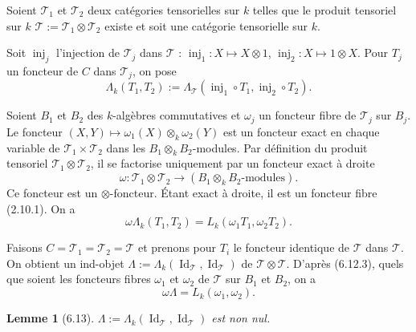 \documentclass[12pt,a4paper]{article}
\theoremstyle{plain}
\newtheorem{lemma}[theorem]{Lemme}
\theoremstyle{definition}
\DeclareMathOperator{\Id}{Id}
\DeclareMathOperator{\inj}{inj}
\begin{document}
Soient $\mathcal{T}_1$ et $\mathcal{T}_2$ deux catégories tensorielles sur $k$ telles que le produit tensoriel sur $k$ $\mathcal{T} := \mathcal{T}_1 \otimes \mathcal{T}_2$ existe et soit une catégorie tensorielle sur $k$.

Soit $\inj_j$ l'injection de $\mathcal{T}_j$ dans $\mathcal{T}$ : $\inj_1 : X \mapsto X \otimes 1$, $\inj_2 : X \mapsto 1 \otimes X$. Pour $T_j$ un foncteur de $C$ dans $\mathcal{T}_j$, on pose
\[
\Lambda_k(T_1, T_2) := \Lambda_\mathcal{T}(\inj_1 \circ T_1, \inj_2 \circ T_2).
\]

Soient $B_1$ et $B_2$ des $k$-algèbres commutatives et $\omega_j$ un foncteur fibre de $\mathcal{T}_j$ sur $B_j$. Le foncteur $(X, Y) \mapsto \omega_1(X) \otimes_k \omega_2(Y)$ est un foncteur exact en chaque variable de $\mathcal{T}_1 \times \mathcal{T}_2$ dans les $B_1 \otimes_k B_2$-modules. Par définition du produit tensoriel $\mathcal{T}_1 \otimes \mathcal{T}_2$, il se factorise uniquement par un foncteur exact à droite
\[
\omega : \mathcal{T}_1 \otimes \mathcal{T}_2 \to (B_1 \otimes_k B_2\text{-modules}).
\]
Ce foncteur est un $\otimes$-foncteur. Étant exact à droite, il est un foncteur fibre (2.10.1). On a
\begin{equation}\label{eq:6.12.3}
\omega \Lambda_k(T_1, T_2) = L_k(\omega_1 T_1, \omega_2 T_2).
\end{equation}

Faisons $C = \mathcal{T}_1 = \mathcal{T}_2 = \mathcal{T}$ et prenons pour $T_i$ le foncteur identique de $\mathcal{T}$ dans $\mathcal{T}$. On obtient un ind-objet $\Lambda := \Lambda_k(\Id_\mathcal{T}, \Id_\mathcal{T})$ de $\mathcal{T} \otimes \mathcal{T}$. D'après (6.12.3), quels que soient les foncteurs fibres $\omega_1$ et $\omega_2$ de $\mathcal{T}$ sur $B_1$ et $B_2$, on a
\begin{equation}\label{eq:6.12.4}
\omega \Lambda = L_k(\omega_1, \omega_2).
\end{equation}

\begin{lemma}[6.13]
$\Lambda := \Lambda_k(\Id_\mathcal{T}, \Id_\mathcal{T})$ est non nul.
\end{lemma}
\end{document}

